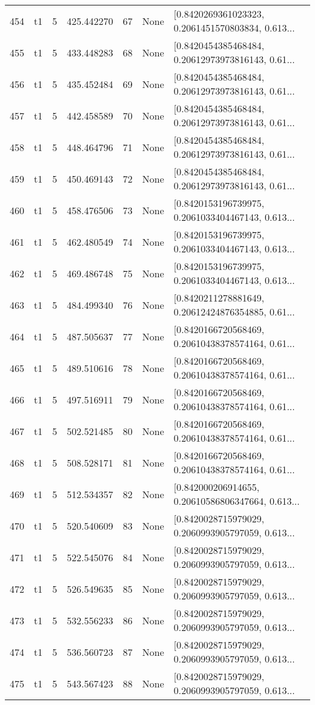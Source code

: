 \begin{tabular}{lllrlll}
454 &  t1 &   5 &  425.442270 &   67 &  None &  [0.8420269361023323, 0.2061451570803834, 0.613... \\
455 &  t1 &   5 &  433.448283 &   68 &  None &  [0.8420454385468484, 0.20612973973816143, 0.61... \\
456 &  t1 &   5 &  435.452484 &   69 &  None &  [0.8420454385468484, 0.20612973973816143, 0.61... \\
457 &  t1 &   5 &  442.458589 &   70 &  None &  [0.8420454385468484, 0.20612973973816143, 0.61... \\
458 &  t1 &   5 &  448.464796 &   71 &  None &  [0.8420454385468484, 0.20612973973816143, 0.61... \\
459 &  t1 &   5 &  450.469143 &   72 &  None &  [0.8420454385468484, 0.20612973973816143, 0.61... \\
460 &  t1 &   5 &  458.476506 &   73 &  None &  [0.8420153196739975, 0.2061033404467143, 0.613... \\
461 &  t1 &   5 &  462.480549 &   74 &  None &  [0.8420153196739975, 0.2061033404467143, 0.613... \\
462 &  t1 &   5 &  469.486748 &   75 &  None &  [0.8420153196739975, 0.2061033404467143, 0.613... \\
463 &  t1 &   5 &  484.499340 &   76 &  None &  [0.8420211278881649, 0.20612424876354885, 0.61... \\
464 &  t1 &   5 &  487.505637 &   77 &  None &  [0.8420166720568469, 0.20610438378574164, 0.61... \\
465 &  t1 &   5 &  489.510616 &   78 &  None &  [0.8420166720568469, 0.20610438378574164, 0.61... \\
466 &  t1 &   5 &  497.516911 &   79 &  None &  [0.8420166720568469, 0.20610438378574164, 0.61... \\
467 &  t1 &   5 &  502.521485 &   80 &  None &  [0.8420166720568469, 0.20610438378574164, 0.61... \\
468 &  t1 &   5 &  508.528171 &   81 &  None &  [0.8420166720568469, 0.20610438378574164, 0.61... \\
469 &  t1 &   5 &  512.534357 &   82 &  None &  [0.842000206914655, 0.20610586806347664, 0.613... \\
470 &  t1 &   5 &  520.540609 &   83 &  None &  [0.8420028715979029, 0.2060993905797059, 0.613... \\
471 &  t1 &   5 &  522.545076 &   84 &  None &  [0.8420028715979029, 0.2060993905797059, 0.613... \\
472 &  t1 &   5 &  526.549635 &   85 &  None &  [0.8420028715979029, 0.2060993905797059, 0.613... \\
473 &  t1 &   5 &  532.556233 &   86 &  None &  [0.8420028715979029, 0.2060993905797059, 0.613... \\
474 &  t1 &   5 &  536.560723 &   87 &  None &  [0.8420028715979029, 0.2060993905797059, 0.613... \\
475 &  t1 &   5 &  543.567423 &   88 &  None &  [0.8420028715979029, 0.2060993905797059, 0.613... \\
\bottomrule
\end{tabular}
